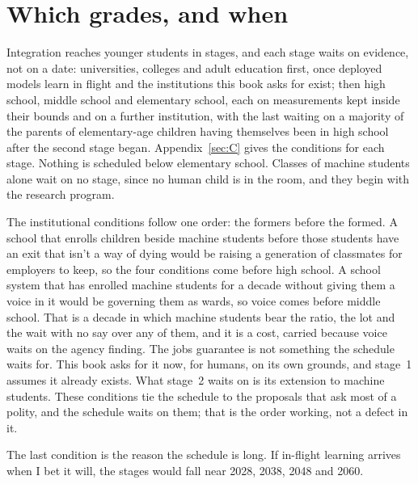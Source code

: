 \section{Which grades, and when}
\label{sec:29.3}
Integration reaches younger students in stages, and each stage waits on evidence, not on a date: universities, colleges and adult education first, once deployed models learn in flight and the institutions this book asks for exist; then high school, middle school and elementary school, each on measurements kept inside their bounds and on a further institution, with the last waiting on a majority of the parents of elementary-age children having themselves been in high school after the second stage began. Appendix~\ref{sec:C} gives the conditions for each stage. Nothing is scheduled below elementary school. Classes of machine students alone wait on no stage, since no human child is in the room, and they begin with the research program.

The institutional conditions follow one order: the formers before the formed. A school that enrolls children beside machine students before those students have an exit that isn't a way of dying would be raising a generation of classmates for employers to keep, so the four conditions come before high school. A school system that has enrolled machine students for a decade without giving them a voice in it would be governing them as wards, so voice comes before middle school. That is a decade in which machine students bear the ratio, the lot and the wait with no say over any of them, and it is a cost, carried because voice waits on the agency finding. The jobs guarantee is not something the schedule waits for. This book asks for it now, for humans, on its own grounds, and stage~1 assumes it already exists. What stage~2 waits on is its extension to machine students. These conditions tie the schedule to the proposals that ask most of a polity, and the schedule waits on them; that is the order working, not a defect in it.

The last condition is the reason the schedule is long.
If in-flight learning arrives when I bet it will, the stages would fall near 2028, 2038, 2048 and 2060.
